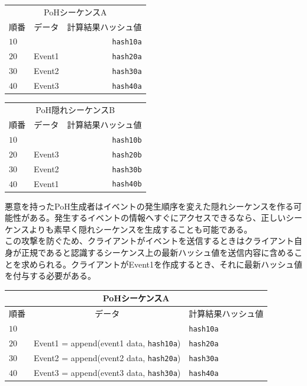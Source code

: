 \documentclass[12pt]{ltjsarticle}
\begin{document}
\begin{center}
  \begin{tabular}{ | l c r |}
    \hline
    \multicolumn{3}{|c|}{PoHシーケンスA} \\
    順番 & データ & 計算結果ハッシュ値  \\ \hline
    $10$ & & \texttt{hash10a} \\ 
    $20$ & Event1 & \texttt{hash20a} \\ 
    $30$ & Event2 & \texttt{hash30a} \\ 
    $40$ & Event3 & \texttt{hash40a} \\
    \hline
    \end{tabular}
  \begin{tabular}{ | l c r |}
    \hline
    \multicolumn{3}{|c|}{PoH隠れシーケンスB} \\
    順番 & データ & 計算結果ハッシュ値  \\ \hline
    $10$ & & \texttt{hash10b}\\ 
    $20$ & Event3 & \texttt{hash20b}  \\ 
    $30$ & Event2 & \texttt{hash30b} \\ 
    $40$ & Event1 & \texttt{hash40b} \\
    \hline
    \end{tabular}
\end{center}

悪意を持ったPoH生成者はイベントの発生順序を変えた隠れシーケンスを作る可能性がある。発生するイベントの情報へすぐにアクセスできるなら、正しいシーケンスよりも素早く隠れシーケンスを生成することも可能である。\\

この攻撃を防ぐため、クライアントがイベントを送信するときはクライアント自身が正規であると認識するシーケンス上の最新ハッシュ値を送信内容に含めることを求められる。クライアントがEvent1を作成するとき、それに最新ハッシュ値を付与する必要がある。\\

\begin{center}
  \begin{tabular}{  l  c l}

    \multicolumn{3}{c}{PoHシーケンスA} \\
    \hline
    順番  & データ & 計算結果ハッシュ値 \\ \hline
    $10$ & & \texttt{hash10a} \\ 
    $20$ & Event1 = append(event1 data, \texttt{hash10a}) & \texttt{hash20a}  \\ 
    $30$ & Event2 = append(event2 data, \texttt{hash20a}) & \texttt{hash30a} \\ 
    $40$ &  Event3 = append(event3 data, \texttt{hash30a}) & \texttt{hash40a} \\
    \end{tabular}
\end{center}
\end{document}

